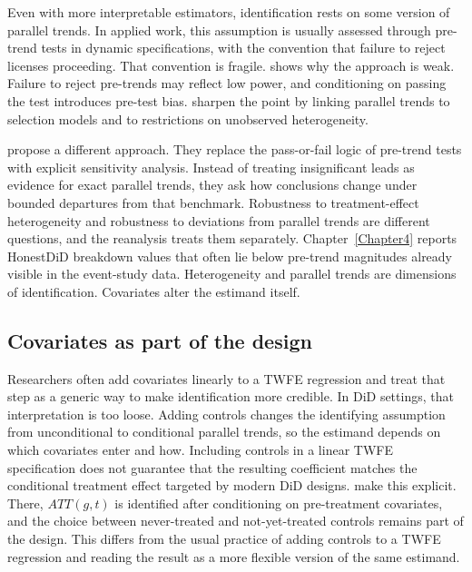 Even with more interpretable estimators, identification rests on some version of parallel trends. In applied work, this assumption is usually assessed through pre-trend tests in dynamic specifications, with the convention that failure to reject licenses proceeding. That convention is fragile. \textcite{roth2022pretest} shows why the approach is weak. Failure to reject pre-trends may reflect low power, and conditioning on passing the test introduces pre-test bias. \textcite{ghanem2024selection} sharpen the point by linking parallel trends to selection models and to restrictions on unobserved heterogeneity.

\textcite{rambachan2023more} propose a different approach. They replace the pass-or-fail logic of pre-trend tests with explicit sensitivity analysis. Instead of treating insignificant leads as evidence for exact parallel trends, they ask how conclusions change under bounded departures from that benchmark. Robustness to treatment-effect heterogeneity and robustness to deviations from parallel trends are different questions, and the reanalysis treats them separately. Chapter~\ref{Chapter4} reports HonestDiD breakdown values that often lie below pre-trend magnitudes already visible in the event-study data. Heterogeneity and parallel trends are dimensions of identification. Covariates alter the estimand itself.

\subsection{Covariates as part of the design}

Researchers often add covariates linearly to a TWFE regression and treat that step as a generic way to make identification more credible. In DiD settings, that interpretation is too loose. Adding controls changes the identifying assumption from unconditional to conditional parallel trends, so the estimand depends on which covariates enter and how. Including controls in a linear TWFE specification does not guarantee that the resulting coefficient matches the conditional treatment effect targeted by modern DiD designs. \textcite{callaway2021difference} make this explicit. There, \(ATT(g,t)\) is identified after conditioning on pre-treatment covariates, and the choice between never-treated and not-yet-treated controls remains part of the design. This differs from the usual practice of adding controls to a TWFE regression and reading the result as a more flexible version of the same estimand.

